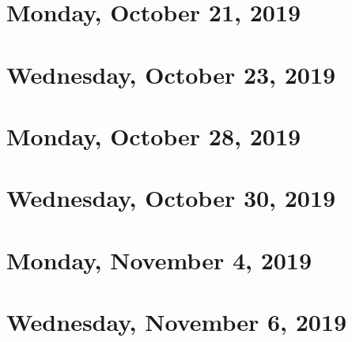 \documentclass{../mynotes}
\begin{document}
\section{Monday, October 21, 2019}
    
\section{Wednesday, October 23, 2019}
    

\section{Monday, October 28, 2019}
    
\section{Wednesday, October 30, 2019}
    
    
\section{Monday, November 4, 2019}
    
\section{Wednesday, November 6, 2019}
    
\end{document}
